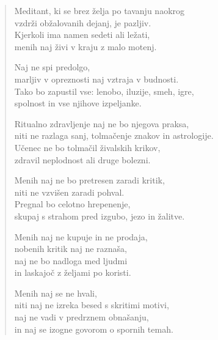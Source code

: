 \clearpage
\begin{verse}

Meditant, ki se brez želja po tavanju naokrog\\
vzdrži obžalovanih dejanj, je pazljiv.\\
Kjerkoli ima namen sedeti ali ležati,\\
menih naj živi v kraju z malo motenj.

Naj ne spi predolgo,\\
marljiv v opreznosti naj vztraja v budnosti.\\
Tako bo zapustil vse: lenobo, iluzije, smeh, igre,\\
spolnost in vse njihove izpeljanke.

Ritualno zdravljenje naj ne bo njegova praksa,\\
niti ne razlaga sanj, tolmačenje znakov in astrologije.\\
Učenec ne bo tolmačil živalskih krikov,\\
zdravil neplodnost ali druge bolezni.

Menih naj ne bo pretresen zaradi kritik,\\
niti ne vzvišen zaradi pohval.\\
Pregnal bo celotno hrepenenje,\\
skupaj s strahom pred izgubo, jezo in žalitve.

Menih naj ne kupuje in ne prodaja,\\
nobenih kritik naj ne raznaša,\\
naj ne bo nadloga med ljudmi\\
in laskajoč z željami po koristi.

Menih naj se ne hvali,\\
niti naj ne izreka besed s skritimi motivi,\\
naj ne vadi v predrznem obnašanju,\\
in naj se izogne govorom o spornih temah.

\end{verse}


